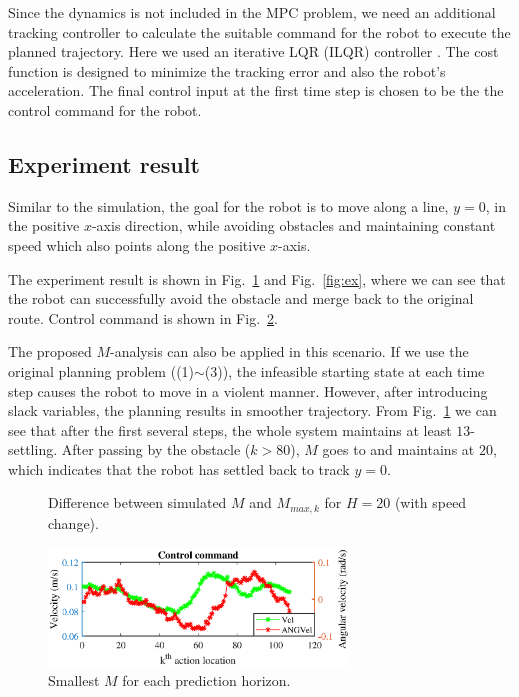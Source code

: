 \documentclass[letterpaper, 10 pt, conference]{ieeeconf}  %
\begin{document}
Since the dynamics is not included in the MPC problem, we need an additional tracking controller to calculate the suitable command for the robot to execute the planned trajectory. Here we used an iterative LQR (ILQR) controller \cite{tassa2012synthesis}. The cost function is designed to minimize the tracking error and also the robot's acceleration. The final control input at the first time step is chosen to be the the control command for the robot.

\subsection{Experiment result}
Similar to the simulation, the goal for the robot is to move along a line, $y=0$, in the positive $x$-axis direction, while avoiding obstacles and maintaining constant speed which also points along the positive $x$-axis.

The experiment result is shown in Fig.~\ref{fig:trajectory} and Fig.~\ref{fig:ex}, where we can see that the robot can successfully avoid the obstacle and merge back to the original route. Control command is shown in Fig.~\ref{fig:command}.

The proposed $M$-analysis can also be applied in this scenario. If we use the original planning problem ((1)$\sim$(3)), the infeasible starting state at each time step causes the robot to move in a violent manner. However, after introducing slack variables, the planning results in smoother trajectory. From Fig.~\ref{fig:trajectory} we can see that after the first several steps, the whole system maintains at least $13$-settling. After passing by the obstacle ($k>80$), $M$ goes to and maintains at $20$, which indicates that the robot has settled back to track $y=0$. 


\begin{figure}[t]
      \centering
       
      \caption{Difference between simulated $M$ and $M_{max,k}$ for $H=20$ (with speed change). }
      \label{fig:trajectory}
\end{figure}

\begin{figure}[t]
      \centering
      \includegraphics[width=8cm]{plot/video_nice.eps}
      
      \caption{Smallest $M$ for each prediction horizon. }
      \label{fig:command}
\end{figure}
\end{document}
